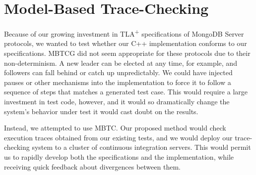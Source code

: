 \documentclass{vldb}
\begin{document}

\section{Model-Based Trace-Checking}
\label{sec:model_based_trace_checking}

Because of our growing investment in TLA\textsuperscript{+} specifications of MongoDB Server protocols, we wanted to test whether our C++ implementation conforms to our specifications.
MBTCG did not seem appropriate for these protocols due to their non-determinism. 
A new leader can be elected at any time, for example, and followers can fall behind or catch up unpredictably. 
We could have injected pauses or other mechanisms into the implementation to force it to follow a sequence of steps that matches a generated test case.
This would require a large investment in test code, however, and it would so dramatically change the system's behavior under test it would cast doubt on the results.

Instead, we attempted to use MBTC.
Our proposed method would check execution traces obtained from our existing tests, and we would deploy our trace-checking system to a cluster of continuous integration servers.
This would permit us to rapidly develop both the specifications and the implementation, while receiving quick feedback about divergences between them.


\end{document}
